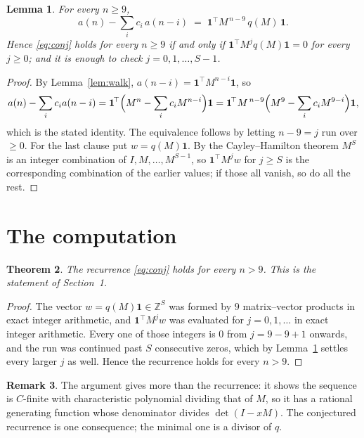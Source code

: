 \documentclass[11pt,a4paper]{article}
\theoremstyle{plain}
\newtheorem{theorem}{Theorem}
\newtheorem{lemma}[theorem]{Lemma}
\theoremstyle{definition}
\newtheorem{remark}[theorem]{Remark}
\begin{document}
\begin{lemma}\label{lem:crit}
For every $n\ge9$,
\[
a(n)-\sum_i c_i\,a(n-i)\;=\;\mathbf{1}^{\!\top}M^{\,n-9}\,q(M)\,\mathbf{1} .
\]
Hence \eqref{eq:conj} holds for every $n\ge9$ if and only if
$\mathbf{1}^{\!\top}M^{j}q(M)\mathbf{1}=0$ for every $j\ge0$; and it is enough to
check $j=0,1,\dots,S-1$.
\end{lemma}

\begin{proof}
By Lemma~\ref{lem:walk}, $a(n-i)=\mathbf{1}^{\!\top}M^{n-i}\mathbf{1}$, so
\[
a(n)-\sum_i c_i a(n-i)
=\mathbf{1}^{\!\top}\Bigl(M^{n}-\sum_i c_i M^{n-i}\Bigr)\mathbf{1}
=\mathbf{1}^{\!\top}M^{\,n-9}\Bigl(M^{9}-\sum_i c_i M^{9-i}\Bigr)\mathbf{1},
\]
which is the stated identity. The equivalence follows by letting $n-9=j$ run over
$\ge0$. For the last clause put $w=q(M)\mathbf{1}$. By the Cayley--Hamilton theorem
$M^{S}$ is an integer combination of $I,M,\dots,M^{S-1}$, so
$\mathbf{1}^{\!\top}M^{j}w$ for $j\ge S$ is the corresponding combination of the
earlier values; if those all vanish, so do all the rest.
\end{proof}

\section{The computation}

\begin{theorem}
The recurrence \eqref{eq:conj} holds for every $n>9$. This is the statement of
Section~1.
\end{theorem}

\begin{proof}
The vector $w=q(M)\mathbf{1}\in\mathbb{Z}^{S}$ was formed by $9$ matrix--vector
products in exact integer arithmetic, and $\mathbf{1}^{\!\top}M^{j}w$ was evaluated for
$j=0,1,\dots$ in exact integer arithmetic. Every one of those integers is $0$ from
$j=9-9+1$ onwards, and the run was continued past $S$ consecutive zeros, which by
Lemma~\ref{lem:crit} settles every larger $j$ as well. Hence the recurrence holds for
every $n>9$.
\end{proof}

\begin{remark}
The argument gives more than the recurrence: it shows the sequence is $C$-finite with
characteristic polynomial dividing that of $M$, so it has a rational generating function
whose denominator divides $\det(I-xM)$. The conjectured recurrence is one consequence; the
minimal one is a divisor of $q$.
\end{remark}
\end{document}

